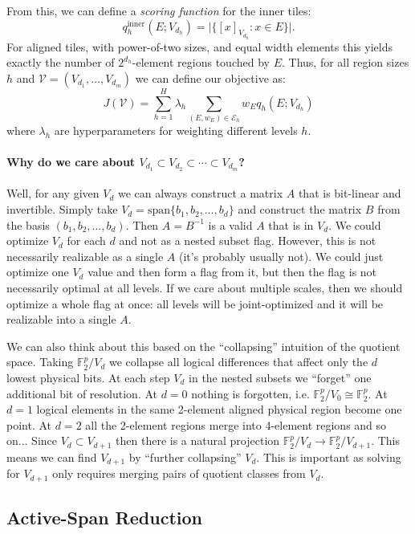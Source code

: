 \documentclass[10pt]{article}
\theoremstyle{remark}
\begin{document}
From this, we can define a {\it scoring function} for the inner tiles:
%
\[
q_h^{\textrm{inner}} (E; V_{d_h}) = \lvert \{ [x]_{V_{d_h}} : x \in E \} \rvert. 
\]
%
For aligned tiles, with power-of-two sizes, and equal width elements this yields exactly the number of $2^{d_h}$-element regions touched by $E$.
Thus, for all region sizes $h$ and $\mathcal{V}=(V_{d_1}, \ldots, V_{d_m})$ we can define our objective as:
%
\[
J(\mathcal{V}) = \sum_{h=1}^H \lambda_h \sum_{(E,w_E)\in\mathcal{E}_h} w_E q_h (E; V_{d_h})
\]
%
where $\lambda_h$ are hyperparameters for weighting different levels $h$.


\paragraph{Why do we care about $V_{d_1} \subset V_{d_2} \subset \cdots \subset V_{d_m}$?} Well, for any given $V_d$ we can always construct a matrix $A$ that is bit-linear and invertible. Simply take $V_d = \text{span}\{b_1, b_2, \ldots, b_d\}$ and construct the matrix $B$ from the basis $(b_1, b_2, \ldots, b_d)$. Then $A=B^{-1}$ is a valid $A$ that is in $V_d$. We could optimize $V_d$ for each $d$ and not as a nested subset flag. However, this is not necessarily realizable as a single $A$ (it's probably usually not). We could just optimize one $V_d$ value and then form a flag from it, but then the flag is not necessarily optimal at all levels. If we care about multiple scales, then we should optimize a whole flag at once: all levels will be joint-optimized and it will be realizable into a single $A$.

We can also think about this based on the ``collapsing'' intuition of the quotient space. Taking $\mathbb{F}_2^p / V_d$ we collapse all logical differences that affect only the $d$ lowest physical bits. At each step $V_d$ in the nested subsets we ``forget'' one additional bit of resolution. At $d=0$ nothing is forgotten, i.e. $\mathbb{F}_2^p / V_0 \cong \mathbb{F}_2^p$. At $d=1$ logical elements in the same 2-element aligned physical region become one point. At $d=2$ all the 2-element regions merge into 4-element regions and so on... Since $V_d \subset V_{d+1}$ then there is a natural projection $\mathbb{F}_2^p /V_d \rightarrow \mathbb{F}_2^p / V_{d+1}$. This means we can find $V_{d+1}$ by ``further collapsing'' $V_d$. This is important as solving for $V_{d+1}$ only requires merging pairs of quotient classes from $V_d$.

\subsection{Active-Span Reduction}
\end{document}
